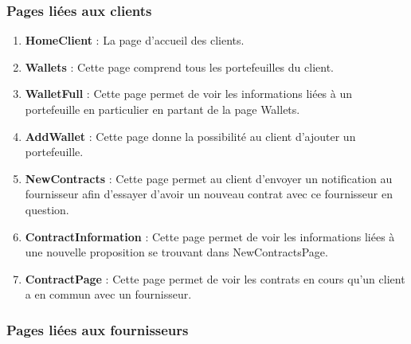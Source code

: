 \subsubsection{Pages liées aux clients}
\begin{enumerate}
\item \textbf{HomeClient} :\newline
La page d’accueil des clients.
\item \textbf{Wallets} :\newline
Cette page comprend tous les portefeuilles du client.
\item \textbf{WalletFull} :\newline
Cette page permet de voir les informations liées à un portefeuille en particulier en partant de la page Wallets.
\item \textbf{AddWallet} :\newline
Cette page donne la possibilité au client d’ajouter un portefeuille.
\item \textbf{NewContracts} : \newline
Cette page permet au client d’envoyer un notification au fournisseur afin d’essayer d’avoir un nouveau contrat avec ce fournisseur en question.
\item \textbf{ContractInformation} : \newline
Cette page permet de voir les informations liées à une nouvelle proposition se trouvant dans NewContractsPage.
\item \textbf{ContractPage} : \newline
Cette page permet de voir les contrats en cours qu’un client a en commun avec un fournisseur.
\end{enumerate} 

\subsubsection{Pages liées aux fournisseurs}

